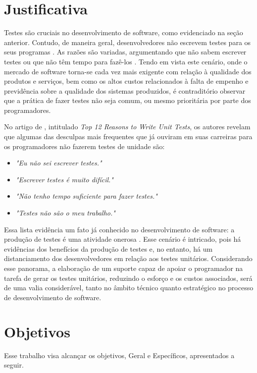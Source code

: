  \section{Justificativa}
  Testes são cruciais no desenvolvimento de software, como evidenciado na seção anterior. Contudo, de maneira geral, desenvolvedores não escrevem testes para os seus programas \cite{burkeCoyner2003}. As razões são variadas, argumentando que não sabem escrever testes ou que não têm tempo para fazê-los \cite{burkeCoyner2003}. Tendo em vista este cenário, onde o mercado de software torna-se cada vez mais exigente com relação à qualidade dos produtos e serviços, bem como os altos custos relacionados à falta de empenho e previdência sobre a qualidade dos sistemas produzidos, é contraditório observar que a prática de fazer testes não seja comum, ou mesmo prioritária por parte dos programadores.
  \par
  \indent No artigo de , intitulado \textit{Top 12 Reasons to Write Unit Tests}, os autores revelam que algumas das desculpas mais frequentes que já ouviram em suas carreiras para os programadores não fazerem testes de unidade são:
  \begin{itemize}
    \item \textit{"Eu não sei escrever testes."}
    \item \textit{"Escrever testes é muito difícil."}
    \item \textit{"Não tenho tempo suficiente para fazer testes."}
    \item \textit{"Testes não são o meu trabalho."}
  \end{itemize}
  \par
  \indent Essa lista evidência um fato já conhecido no desenvolvimento de software: a produção de testes é uma atividade onerosa \cite{barbosaEtAl2009}. Esse cenário é intricado, pois há evidências dos benefícios da produção de testes e, no entanto, há um distanciamento dos desenvolvedores em relação aos testes unitários. Considerando esse panorama, a elaboração de um suporte capaz de apoiar o programador na tarefa de gerar os testes unitários, reduzindo o esforço e os custos associados, será de uma valia considerável, tanto no âmbito técnico quanto estratégico no processo de desenvolvimento de software.
 
  \section{Objetivos}
  Esse trabalho visa alcançar os objetivos, Geral e Específicos, apresentados a seguir.
